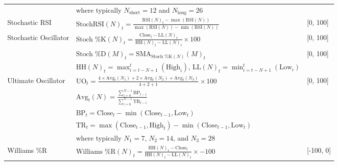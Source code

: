\begin{table}[htb!]
\begin{tabularx}{\textwidth}{@{}lXl@{}}
\addlinespace
& where typically $N_{\text{short}} = 12$ and $N_{\text{long}} = 26$ & \\
\addlinespace
Stochastic RSI & $\text{StochRSI}(N)_t = \frac{\text{RSI}(N)_t - \max(\text{RSI}(N))}{\max(\text{RSI}(N)) - \min(\text{RSI}(N))}$ & [0, 100] \\
\addlinespace
Stochastic Oscillator & $\text{Stoch \%K}(N)_t = \frac{\text{Close}_t - \text{LL}(N)_t}{\text{HH}(N)_t - \text{LL}(N)_t} \times 100$ & [0, 100] \\
\addlinespace
& $\text{Stoch \%D}(M)_t = \text{SMA}_{\text{Stoch \%K}(N)}(M)_t$ & [0, 100] \\
\addlinespace
& $\text{HH}(N)_t = \max_{i=t-N+1}^{t}(\text{High}_i)$, $\text{LL}(N)_t = \min_{i=t-N+1}^{t}(\text{Low}_i)$ & \\
\addlinespace
Ultimate Oscillator & $\text{UO}_t = \frac{4 \times \text{Avg}_t(N_1) + 2 \times \text{Avg}_t(N_2) + \text{Avg}_t(N_3)}{4+2+1} \times 100$ & [0, 100] \\
\addlinespace
& $\text{Avg}_t(N) = \frac{\sum_{i=0}^{N-1}\text{BP}_{t-i}}{\sum_{i=0}^{N-1}\text{TR}_{t-i}}$ & \\
\addlinespace
& $\text{BP}_t = \text{Close}_t - \min(\text{Close}_{t-1}, \text{Low}_t)$ & \\
\addlinespace
& $\text{TR}_t = \max(\text{Close}_{t-1}, \text{High}_t) - \min(\text{Close}_{t-1}, \text{Low}_t)$ & \\
\addlinespace
& where typically $N_1 = 7$, $N_2 = 14$, and $N_3 = 28$ & \\
\addlinespace
Williams \%R & $\text{Williams \%R}(N)_t = \frac{\text{HH}(N)_t - \text{Close}_t}{\text{HH}(N)_t - \text{LL}(N)_t} \times -100$ & [-100, 0] \\
\bottomrule
\end{tabularx}
\end{table}
